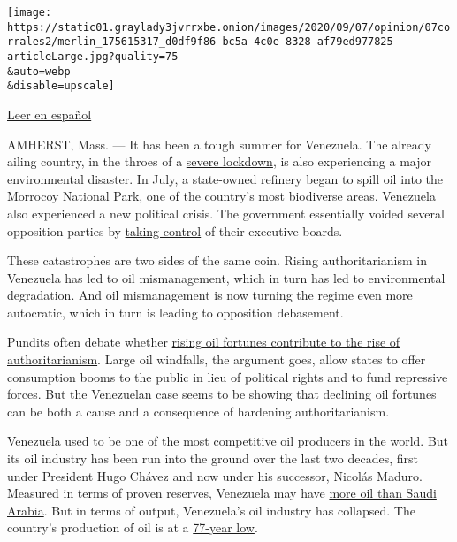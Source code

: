 \texttt{[image: https://static01.graylady3jvrrxbe.onion/images/2020/09/07/opinion/07corrales2/merlin\_175615317\_d0df9f86-bc5a-4c0e-8328-af79ed977825-articleLarge.jpg?quality=75\\\&auto=webp\\\&disable=upscale]}

\href{https://www.nytimes3xbfgragh.onion/es/2020/09/07/espanol/opinion/lo-que-los-derrames-petroleros-en-venezuela-revelan.html}{Leer
en español}

AMHERST, Mass. --- It has been a tough summer for Venezuela. The already
ailing country, in the throes of a
\href{https://www.bbc.com/news/world-52103747}{severe lockdown}, is also
experiencing a major environmental disaster. In July, a state-owned
refinery began to spill oil into the
\href{https://www.bbc.com/news/world-latin-america-53767424}{Morrocoy
National Park}, one of the country's most biodiverse areas. Venezuela
also experienced a new political crisis. The government essentially
voided several opposition parties by
\href{https://www.nytimes3xbfgragh.onion/2020/06/16/world/americas/venezuela-maduro-supreme-court.html}{taking
control} of their executive boards.

These catastrophes are two sides of the same coin. Rising
authoritarianism in Venezuela has led to oil mismanagement, which in
turn has led to environmental degradation. And oil mismanagement is now
turning the regime even more autocratic, which in turn is leading to
opposition debasement.

Pundits often debate whether
\href{https://www.vox.com/2014/4/10/5601062/oil-curse-explained}{rising
oil fortunes contribute to the rise of authoritarianism}. Large oil
windfalls, the argument goes, allow states to offer consumption booms to
the public in lieu of political rights and to fund repressive forces.
But the Venezuelan case seems to be showing that declining oil fortunes
can be both a cause and a consequence of hardening authoritarianism.

Venezuela used to be one of the most competitive oil producers in the
world. But its oil industry has been run into the ground over the last
two decades, first under President Hugo Chávez and now under his
successor, Nicolás Maduro. Measured in terms of proven reserves,
Venezuela may have
\href{https://www.opec.org/opec_web/en/data_graphs/330.htm}{more oil
than Saudi Arabia}. But in terms of output, Venezuela's oil industry has
collapsed. The country's production of oil is at a
\href{https://www.reuters.com/article/us-venezuela-oil-exports/venezuelas-oil-exports-sank-in-june-to-77-year-low-data-idUSKBN2427AC}{77-year
low}.

